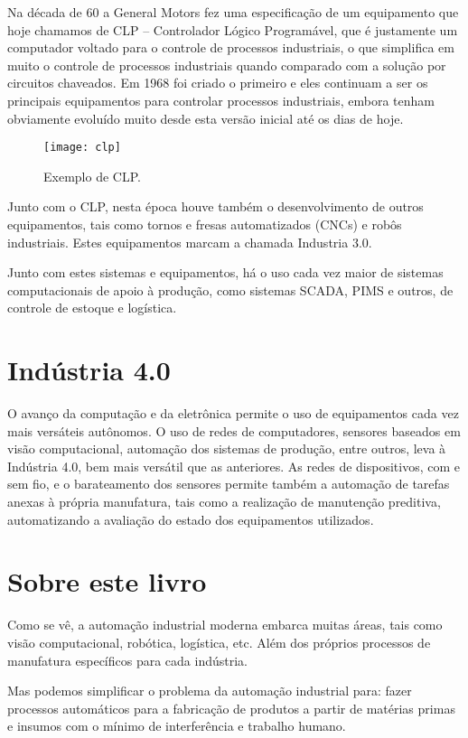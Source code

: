 Na década de 60 a General Motors fez uma especificação de um equipamento que hoje chamamos de CLP -- Controlador Lógico Programável, que é justamente um computador voltado para o controle de processos industriais, o que simplifica em muito o controle de processos industriais quando comparado com a solução por circuitos chaveados. Em 1968 foi criado o primeiro e eles continuam a ser os principais equipamentos para controlar processos industriais, embora tenham obviamente evoluído muito desde esta versão inicial até os dias de hoje.
\begin{figure}
    \centering
    \texttt{[image: clp]}
    \caption{Exemplo de CLP.}
\end{figure}

Junto com o CLP, nesta época houve também o desenvolvimento de outros equipamentos, tais como tornos e fresas automatizados (CNCs) e  robôs industriais. Estes equipamentos marcam a chamada Industria 3.0.

Junto com estes sistemas e equipamentos, há o uso cada vez maior de sistemas computacionais de apoio à produção, como sistemas SCADA, PIMS e outros, de controle de estoque e logística.

\section{Indústria 4.0}
O avanço da computação e da eletrônica permite o uso de equipamentos cada vez mais versáteis autônomos. O uso de redes de computadores, sensores baseados em visão computacional, automação dos sistemas de produção, entre outros, leva à Indústria 4.0, bem mais versátil que as anteriores. As redes de dispositivos, com e sem fio, e o barateamento dos sensores permite também a automação de tarefas anexas à própria manufatura, tais como a realização de manutenção preditiva, automatizando a avaliação do estado dos equipamentos utilizados.

\section{Sobre este livro}
Como se vê, a automação industrial moderna embarca muitas áreas, tais como visão computacional, robótica, logística, etc. Além dos próprios processos de manufatura específicos para cada indústria.

Mas podemos simplificar o problema da automação industrial para: fazer processos automáticos para a fabricação de produtos a partir de matérias primas e insumos com o mínimo de interferência e trabalho humano.

